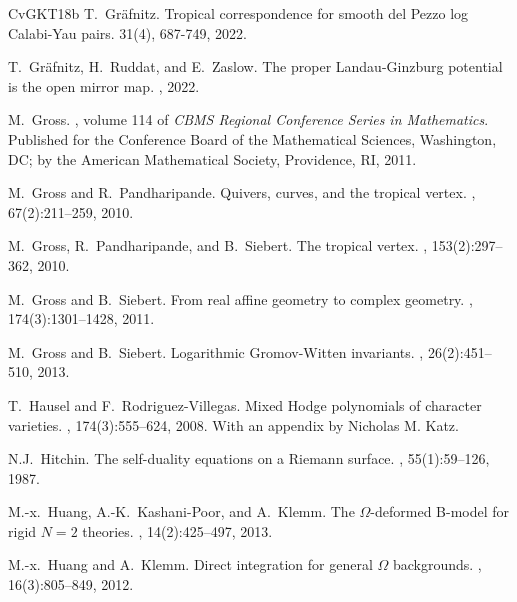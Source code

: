 \documentclass[11pt,letterpaper]{amsart}
\begin{document}
\begin{thebibliography}{CvGKT18b}
T.~Gr{\"a}fnitz.
\newblock Tropical correspondence for smooth del {P}ezzo log {C}alabi-{Y}au pairs.
 31(4), 687-749, 2022.

T.~Gr{\"a}fnitz, H.~Ruddat, and E.~Zaslow.
\newblock The proper Landau-Ginzburg potential is the open mirror map.
, 2022.



M.~Gross.
, volume 114 of {\em CBMS
  Regional Conference Series in Mathematics}.
\newblock Published for the Conference Board of the Mathematical Sciences,
  Washington, DC; by the American Mathematical Society, Providence, RI, 2011.


M.~Gross and R.~Pandharipande.
\newblock Quivers, curves, and the tropical vertex.
, 67(2):211--259, 2010.

M.~Gross, R.~Pandharipande, and B.~Siebert.
\newblock The tropical vertex.
, 153(2):297--362, 2010.

M.~Gross and B.~Siebert.
\newblock From real affine geometry to complex geometry.
, 174(3):1301--1428, 2011.

M.~Gross and B.~Siebert.
\newblock Logarithmic {G}romov-{W}itten invariants.
, 26(2):451--510, 2013.


T.~Hausel and F.~Rodriguez-Villegas.
\newblock Mixed {H}odge polynomials of character varieties.
, 174(3):555--624, 2008.
\newblock With an appendix by Nicholas M. Katz.


N.J.~Hitchin.
\newblock The self-duality equations on a {R}iemann surface.
,
55(1):59--126, 1987.
 

 


M.-x.~Huang, A.-K.~Kashani-Poor, and A.~Klemm.
\newblock The {$\Omega$}-deformed {B}-model for rigid {$N=2$} theories.
, 14(2):425--497, 2013.


M.-x.~Huang and A.~Klemm.
\newblock Direct integration for general {$\Omega$} backgrounds. 
, 16(3):805--849, 2012. 



\end{thebibliography}
\end{document}
